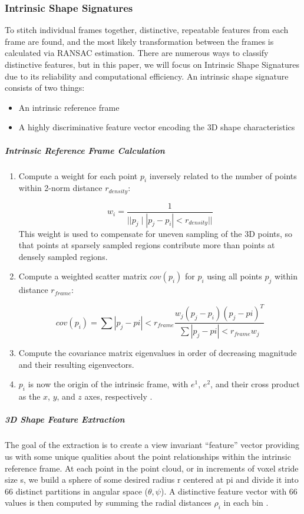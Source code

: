 \documentclass[12pt]{drexelthesis}
\let\Oldsubsubsection\subsubsection
\renewcommand{\subsubsection}{\FloatBarrier\Oldsubsubsection}
\begin{document}
\subsubsection{Intrinsic Shape Signatures}
To stitch individual frames together, distinctive, repeatable features from each frame are found, and the most likely transformation between the frames is calculated via RANSAC estimation. There are numerous ways to classify distinctive features, but in this paper, we will focus on Intrinsic Shape Signatures due to its reliability and computational efficiency.
An intrinsic shape signature consists of two things:
\begin{itemize}
	\item An intrinsic reference frame
	\item A highly discriminative feature vector encoding the 3D shape characteristics
\end{itemize}
\subparagraph{Intrinsic Reference Frame Calculation}
\begin{enumerate}
	\item Compute a weight for each point $p_{i}$ inversely related to the number of points within 2-norm distance $r_{density}$:
	
		\begin{equation}
		w_{i}=  \frac{1}{||p_{j} \mid |p_{j}-p_{i}| < r_{density}||}
		\end{equation}
		This weight is used to compensate for uneven sampling of the 3D points, so that points at sparsely sampled regions contribute more than points at densely sampled regions. 

	\item Compute a weighted scatter matrix $cov(p_{i})$ for $p_{i}$ using all points $p_{j}$ within distance $r_{frame}$:
	
		\begin{equation}
		cov(p_{i})= \sum{|p_{j}-p{i}| < r_{frame}}\frac{w_{j}(p_{j}-p_{i})(p_{j}-p{i})^{T}}{ \sum{|p_{j}-p{i}| < r_{frame}}w_{j}}
		\end{equation}
		
	\item Compute the covariance matrix eigenvalues in order of decreasing magnitude and their resulting eigenvectors.
	\item $p_{i}$ is now the origin of the intrinsic frame, with $e^{1}$, $e^{2}$, and their cross product as the $x$, $y$, and $z$ axes, respectively \cite{RN60}.
\end{enumerate}

\subparagraph{3D Shape Feature Extraction}
The goal of the extraction is to create a view invariant “feature” vector providing us with some unique qualities about the point relationships within the intrinsic reference frame. At each point in the point cloud, or in increments of voxel stride size s, we build a sphere of some desired radius r centered at pi and divide it into 66 distinct partitions in angular space ($\theta, \psi$). A distinctive feature vector with 66 values is then computed by summing the radial distances $\rho_{i}$ in each bin \cite{RN60}.
\end{document}
